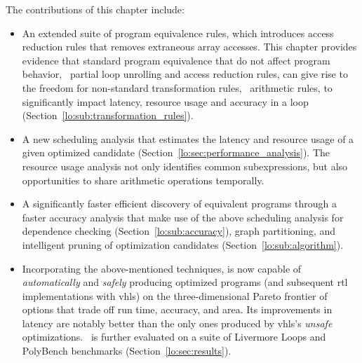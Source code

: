 The contributions of this chapter include:
\begin{itemize}

    \item An extended suite of program equivalence rules, which introduces
    access reduction rules that removes extraneous array accesses.  This
    chapter provides evidence that standard program equivalence that do not
    affect program behavior, \eg~partial loop unrolling and access reduction
    rules, can give rise to the freedom for non-standard transformation rules,
    \eg~arithmetic rules, to significantly impact latency, resource usage and
    accuracy in a loop (Section~\ref{lo:sub:transformation_rules}).

    \item A new scheduling analysis that estimates the
    latency and resource usage of a given optimized candidate
    (Section~\ref{lo:sec:performance_analysis}).  The resource usage analysis
    not only identifies common subexpressions, but also opportunities to share
    arithmetic operations temporally.

    \item A significantly faster efficient discovery of equivalent programs
    through a faster accuracy analysis that make use of the above scheduling
    analysis for dependence checking (Section~\ref{lo:sub:accuracy}),
    graph partitioning, and intelligent pruning of optimization candidates
    (Section~\ref{lo:sub:algorithm}).

    \item Incorporating the above-mentioned techniques, \soap{} is now
    capable of \emph{automatically} and \emph{safely} producing optimized
    programs (and subsequent \gls{rtl} implementations with \gls{vhls}) on
    the three-dimensional Pareto frontier of options that trade off run time,
    accuracy, and area.  Its improvements in latency are notably better than
    the only ones produced by \gls{vhls}'s \emph{unsafe} optimizations.
    \soap~is further evaluated on a suite of Livermore Loops and PolyBench
    benchmarks (Section~\ref{lo:sec:results}).

\end{itemize}

